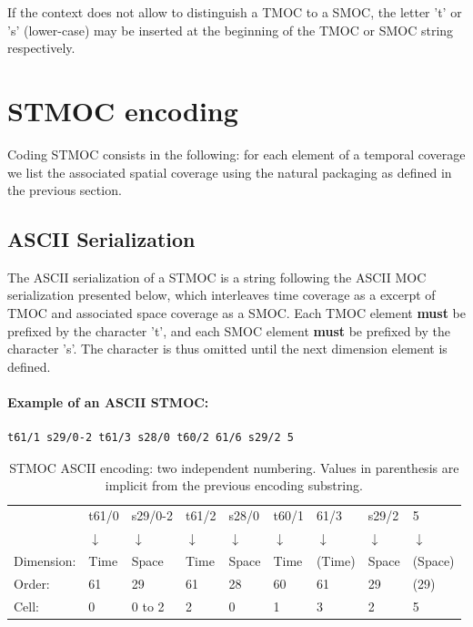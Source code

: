 \documentclass[11pt,a4paper]{ivoa}
\begin{document}
If the context does not allow to distinguish a TMOC to a SMOC,
the letter ’t’ or ’s’ (lower-case) may be inserted at the beginning
of the TMOC or SMOC string respectively.

\section{STMOC encoding}
\label{sec:stmoc}
Coding STMOC consists in the following: for each element of a
temporal coverage we list the associated spatial coverage using the
natural packaging as defined in the previous section. 

\subsection{ASCII Serialization}
The ASCII serialization of a STMOC is a string following the ASCII MOC
serialization presented below, which interleaves time coverage as a
excerpt of TMOC and associated space coverage as a SMOC. Each TMOC
element {\bf must} be prefixed by the character 't', and each SMOC
element {\bf must} be prefixed by the character 's'.
The character is thus omitted until the next dimension element is
defined.

\paragraph{Example of an ASCII STMOC:}
\begin{lstlisting}[]
  t61/1 s29/0-2 t61/3 s28/0 t60/2 61/6 s29/2 5
\end{lstlisting}

\begin{table}[!htbp]
\begin{center}
   {\small
   \begin{tabular} { l l l l l l l l l }
   & t61/0      & s29/0-2    & t61/2      & s28/0 & t60/1 & 61/3 & s29/2 & 5\\
   & $\downarrow$ & $\downarrow$ & $\downarrow$ & $\downarrow$ & $\downarrow$ & $\downarrow$ & $\downarrow$ & $\downarrow$ \\
Dimension: & Time & Space  & Time  & Space & Time  & (Time) & Space & (Space) \\
Order:     & 61   & 29     & 61    & 28    & 60    & 61     &  29   & (29)\\
Cell:      & 0    & 0 to 2 & 2     & 0     & 1     & 3      &  2    & 5 \\
\end{tabular}
}
\end{center}
\caption*{STMOC ASCII encoding: two independent numbering. Values in parenthesis are implicit from the previous encoding substring.}\label{table:stmoc-ascii-ex}
\end{table}
\end{document}
